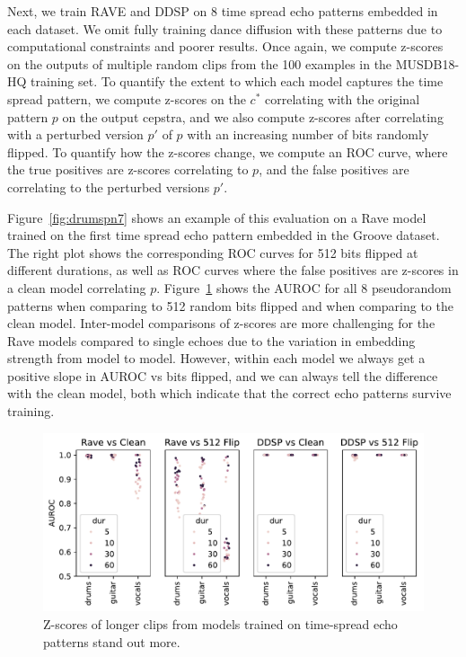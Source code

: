 \documentclass[letterpaper]{article} %
\begin{document}
Next, we train RAVE and DDSP on 8 time spread echo patterns embedded in each dataset.  We omit fully training dance diffusion with these patterns due to computational constraints and poorer results.  Once again, we compute z-scores on the outputs of multiple random clips from the 100 examples in the MUSDB18-HQ training set.  To quantify the extent to which each model captures the time spread pattern, we compute z-scores on the $c^*$ correlating with the original pattern $p$ on the output cepstra, and we also compute z-scores after correlating with a perturbed version $p'$ of $p$ with an increasing number of bits randomly flipped.  To quantify how the z-scores change, we compute an ROC curve, where the true positives are z-scores correlating to $p$, and the false positives are correlating to the perturbed versions $p'$.  


Figure~\ref{fig:drumspn7} shows an example of this evaluation on a Rave model trained on the first time spread echo pattern embedded in the Groove dataset.  The right plot shows the corresponding ROC curves for 512 bits flipped at different durations, as well as ROC curves where the false positives are z-scores in a clean model correlating $p$.  Figure~\ref{fig:pneval} shows the AUROC for all 8 pseudorandom patterns when comparing to 512 random bits flipped and when comparing to the clean model.  Inter-model comparisons of z-scores are more challenging for the Rave models compared to single echoes due to the variation in embedding strength from model to model.   However, within each model we always get a positive slope in AUROC vs bits flipped, and we can always tell the difference with the clean model, both which indicate that the correct echo patterns survive training.


\begin{figure}
    \centering
    \includegraphics[width=\columnwidth]{figs/PNEval.pdf}
    \caption{Z-scores of longer clips from models trained on time-spread echo patterns stand out more.}
    \label{fig:pneval}
\end{figure}
\end{document}
